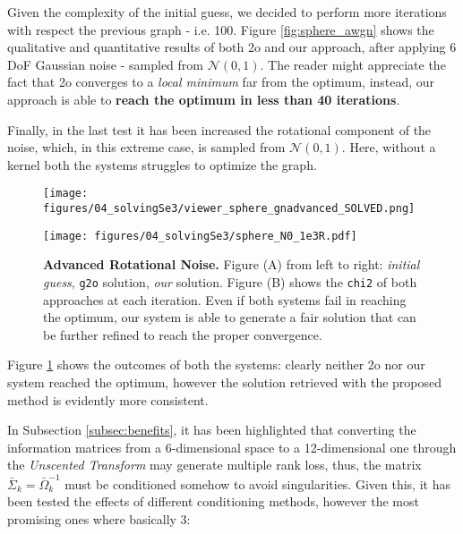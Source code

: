 \noindent Given the complexity of the initial guess, we decided to perform more iterations with respect the previous graph - i.e. 100. Figure \ref{fig:sphere_awgn} shows the qualitative and quantitative results of both \g2o and our approach, after applying 6 DoF Gaussian noise - sampled from $\mathcal{N}(0,1)$. The reader might appreciate the fact that \g2o converges to a \textit{local minimum} far from the optimum, instead, our approach is able to \textbf{reach the optimum in less than 40 iterations}.

Finally, in the last test it has been increased the rotational component of the noise, which, in this extreme case, is sampled from $\mathcal{N}(0,1)$. Here, without a kernel both the systems struggles to optimize the graph.

\begin{figure}[!hbt]
    \centering    
    \begin{minipage}[t!]{0.45\textwidth}
        \centering
        \texttt{[image: figures/04\_solvingSe3/viewer\_sphere\_gnadvanced\_SOLVED.png]}
        \subcaption{} 
        \label{fig:sphere_gnadvanced_solution}
    \end{minipage}
    \begin{minipage}[t!]{0.45\textwidth}
        \centering
        \texttt{[image: figures/04\_solvingSe3/sphere\_N0\_1e3R.pdf]}
        \subcaption{}
        \label{fig:sphere_gnadvanced_chi2}
    \end{minipage}%
    \caption{\textbf{Advanced Rotational Noise.} Figure (A) from left to right: \textit{initial guess}, \texttt{g2o} solution, \textit{our} solution. Figure (B) shows the \texttt{chi2} of both approaches at each iteration. Even if both systems fail in reaching the optimum, our system is able to generate a fair solution that can be further refined to reach the proper convergence.}
    \label{fig:sphere_gnadvanced}
\end{figure}

Figure \ref{fig:sphere_gnadvanced} shows the outcomes of both the systems: clearly neither \g2o nor our system reached the optimum, however the solution retrieved with the proposed method is evidently more consistent.

In Subsection \ref{subsec:benefits}, it has been highlighted that converting the information matrices from a 6-dimensional space to a 12-dimensional one through the \textit{Unscented Transform} may generate multiple rank loss, thus, the matrix $\bar{\Sigma}_k = \bar{\Omega}_k^{-1}$ must be conditioned somehow to avoid singularities. Given this, it has been tested the effects of different conditioning methods, however the most promising ones where basically 3:

